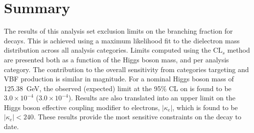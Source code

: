 \section{Summary}
\label{subsection:hee_s_b_models_summary}

The results of this analysis set exclusion limits on the branching fraction for \Hee decays. This is achieved using a maximum likelihood fit to the dielectron mass distribution across all analysis categories. Limits computed using the $\mathrm{CL}_s$ method are presented both as a function of the Higgs boson mass, and per analysis category. The contribution to the overall sensitivity from categories targeting \ggH and VBF production is similar in magnitude. For a nominal Higgs boson mass of 125.38~GeV, the observed (expected) limit at the 95\% CL on \BHee is found to be $3.0\times10^{-4}$ ($3.0\times10^{-4}$). Results are also translated into an upper limit on the Higgs boson effective coupling modifier to electrons, $|\kappa_{e}|$, which is found to be $|\kappa_{e}|<240$. These results provide the most sensitive constraints on the \Hee decay to date.